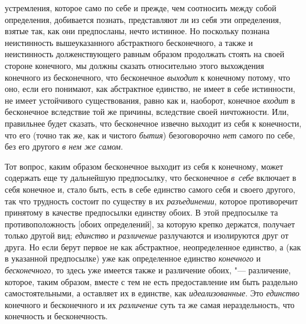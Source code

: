 устремления, которое само по себе и прежде, чем соотносить между собой
определения, добивается познать, представляют ли из себя эти определения,
взятые так, как они предпосланы, нечто истинное. Но поскольку познана
неистинность вышеуказанного абстрактного бесконечного, а также и
неистинность долженствующего равным образом продолжать стоять на своей
стороне конечного, мы должны сказать относительно этого выхождения
конечного из бесконечного, что бесконечное
{\em выходит} к конечному потому, что оно, если его
понимают, как абстрактное единство, не имеет в себе истинности, не имеет
устойчивого существования, равно как и, наоборот, конечное
{\em входит} в бесконечное вследствие той же причины,
вследствие своей ничтожности. Или, правильнее будет сказать, что
бесконечное извечно выходит из себя к конечности, что его (точно так же,
как и чистого {\em бытия}) безоговорочно
{\em нет} самого по себе, без его другого {\em в нем же самом}.

Тот вопрос, каким образом бесконечное выходит из себя к конечному, может
содержать еще ту дальнейшую предпосылку, что бесконечное
{\em в~себе} включает в себя конечное и, стало быть,
есть в себе единство самого себя и своего другого, так что трудность
состоит по существу в их {\em разъединении}, которое
противоречит принятому в качестве предпосылки единству обоих. В этой
предпосылке та противоположность [обоих определений], за которую крепко
держатся, получает только другой вид; {\em единство} и
{\em различение} разлучаются и изолируются друг от
друга. Но если берут первое не как абстрактное, неопределенное единство, а
(как в указанной предпосылке) уже как определенное единство
{\em конечного} и {\em бесконечного}, то здесь уже имеется также и
различение обоих, "--- различение, которое, таким образом, вместе с тем не
есть предоставление им быть раздельно самостоятельными, а оставляет их в
единстве, как {\em идеализованные}. Это {\em единство} конечного и
бесконечного и их {\em различение} суть та же самая нераздельность,
что конечность и бесконечность.


